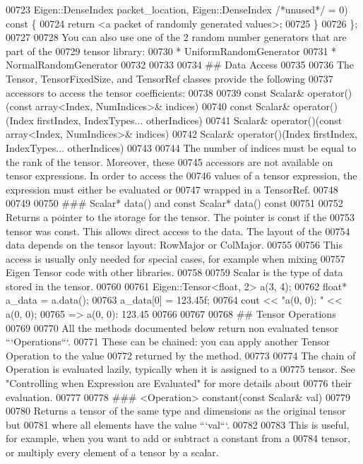 \begin{DoxyCode}
00723           Eigen::DenseIndex packet\_location, Eigen::DenseIndex /*unused*/ = 0) const \{
00724         return <a packet of randomly generated values>;
00725       \}
00726     \};
00727 
00728 You can also use one of the 2 random number generators that are part of the
00729 tensor library:
00730 *   UniformRandomGenerator
00731 *   NormalRandomGenerator
00732 
00733 
00734 ## Data Access
00735 
00736 The Tensor, TensorFixedSize, and TensorRef classes provide the following
00737 accessors to access the tensor coefficients:
00738 
00739     const Scalar& operator()(const array<Index, NumIndices>& indices)
00740     const Scalar& operator()(Index firstIndex, IndexTypes... otherIndices)
00741     Scalar& operator()(const array<Index, NumIndices>& indices)
00742     Scalar& operator()(Index firstIndex, IndexTypes... otherIndices)
00743 
00744 The number of indices must be equal to the rank of the tensor. Moreover, these
00745 accessors are not available on tensor expressions. In order to access the
00746 values of a tensor expression, the expression must either be evaluated or
00747 wrapped in a TensorRef.
00748 
00749 
00750 ### Scalar* data() and const Scalar* data() const
00751 
00752 Returns a pointer to the storage for the tensor.  The pointer is const if the
00753 tensor was const.  This allows direct access to the data.  The layout of the
00754 data depends on the tensor layout: RowMajor or ColMajor.
00755 
00756 This access is usually only needed for special cases, for example when mixing
00757 Eigen Tensor code with other libraries.
00758 
00759 Scalar is the type of data stored in the tensor.
00760 
00761     Eigen::Tensor<float, 2> a(3, 4);
00762     float* a\_data = a.data();
00763     a\_data[0] = 123.45f;
00764     cout << "a(0, 0): " << a(0, 0);
00765     => a(0, 0): 123.45
00766 
00767 
00768 ## Tensor Operations
00769 
00770 All the methods documented below return non evaluated tensor ```Operations```.
00771 These can be chained: you can apply another Tensor Operation to the value
00772 returned by the method.
00773 
00774 The chain of Operation is evaluated lazily, typically when it is assigned to a
00775 tensor.  See "Controlling when Expression are Evaluated" for more details about
00776 their evaluation.
00777 
00778 ### <Operation> constant(const Scalar& val)
00779 
00780 Returns a tensor of the same type and dimensions as the original tensor but
00781 where all elements have the value ```val```.
00782 
00783 This is useful, for example, when you want to add or subtract a constant from a
00784 tensor, or multiply every element of a tensor by a scalar.

\end{DoxyCode}
